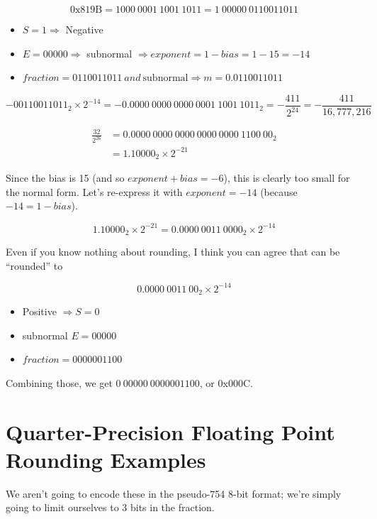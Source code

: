 \documentclass{article}
\begin{document}
\[\mathrm{0x819B} = 1000\ 0001\ 1001\ 1011 = 1\ 00000\ 0110011011\]

\begin{itemize}
\item $S=1 \Rightarrow$ Negative
\item $E = 00000 \Rightarrow$ subnormal $\Rightarrow exponent = 1 - bias = 1 - 15 = -14$
\item $fraction = 0110011011\ and\ \mathrm{subnormal} \Rightarrow m = 0.0110011011$
\end{itemize}

\[-00110011011_2 \times 2^{-14} = -0.0000\ 0000\ 0000\ 0001\ 1001\ 1011_2 = -\frac{411}{2^{24}} = -\frac{411}{16,777,216}\]

\vspace{1.5cm}

\begin{align*}
\frac{32}{2^{26}}   &= 0.0000\ 0000\ 0000\ 0000\ 0000\ 1100\ 00_2 \\
                    &= 1.10000_2 \times 2^{-21}
\end{align*}

Since the bias is 15 (and so $exponent + bias = -6$), this is clearly too small
for the normal form. Let's re-express it with $exponent=-14$ (because
$-14 = 1 - bias$).

\[1.10000_2 \times 2^{-21} = 0.0000\ 0011\ 0000_2 \times 2^{-14}\]

Even if you know nothing about rounding, I think you can agree that can be
``rounded'' to

\[0.0000\ 0011\ 00_2 \times 2^{-14}\]

\begin{itemize}
\item Positive $\Rightarrow S=0$
\item subnormal $E = 00000$
\item $fraction = 0000001100$
\end{itemize}

Combining those, we get $0\ 00000\ 0000001100$, or 0x000C.

\section{Quarter-Precision Floating Point Rounding Examples}

We aren't going to encode these in the pseudo-754 8-bit format; we're simply
going to limit ourselves to 3 bits in the fraction.
\end{document}
